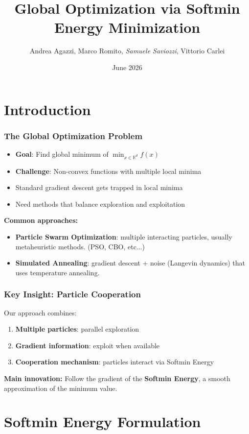 \documentclass{beamer}
\title[Softmin Energy Minimization]{Global Optimization via Softmin Energy Minimization}
\author[AA, MR, SS, VC]{Andrea Agazzi, Marco Romito, \emph{Samuele Saviozzi}, Vittorio Carlei}
\date{June 2026}
\begin{document}
\frame{\titlepage}

\section{Introduction}

\begin{frame}
\frametitle{The Global Optimization Problem}
\begin{itemize}
  \item \textbf{Goal}: Find global minimum of $\min_{x \in \mathbb{R}^d} f(x)$
  \item \textbf{Challenge}: Non-convex functions with multiple local minima
  \item Standard gradient descent gets trapped in local minima
  \item Need methods that balance exploration and exploitation
\end{itemize}
\pause
\vspace{0.5cm}
\textbf{Common approaches:}
\begin{itemize}
  \item \textbf{Particle Swarm Optimization}: multiple interacting particles, usually metaheuristic methods. (PSO, CBO, etc...)
  \item \textbf{Simulated Annealing}: gradient descent + noise (Langevin dynamics) that uses temperature annealing.
\end{itemize}
\end{frame}

\begin{frame}
\frametitle{Key Insight: Particle Cooperation}
Our approach combines:
\begin{enumerate}
  \item \textbf{Multiple particles}: parallel exploration
  \item \textbf{Gradient information}: exploit when available
  \item \textbf{Cooperation mechanism}: particles interact via Softmin Energy
\end{enumerate}
\pause

\vspace{0.5cm}
\textbf{Main innovation:} Follow the gradient of the \textbf{Softmin Energy}, a smooth approximation of the minimum value.

\end{frame}

\section{Softmin Energy Formulation}
\end{document}
